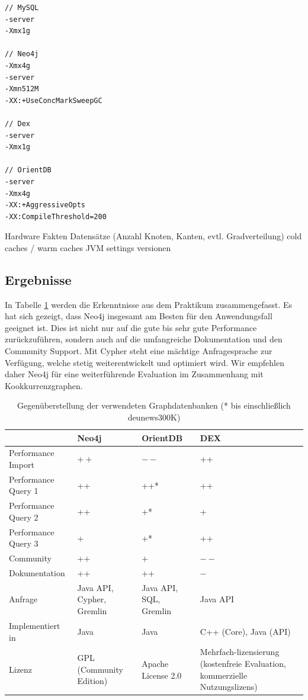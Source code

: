 \documentclass[11pt, a4paper, oneside]{article} %
\begin{document}
\begin{lstlisting}
// MySQL
-server
-Xmx1g

// Neo4j
-Xmx4g
-server
-Xmn512M
-XX:+UseConcMarkSweepGC

// Dex
-server
-Xmx1g

// OrientDB
-server
-Xmx4g
-XX:+AggressiveOpts 
-XX:CompileThreshold=200
\end{lstlisting}


Hardware Fakten
Datensätze (Anzahl Knoten, Kanten, evtl. Gradverteilung)
cold caches / warm caches
JVM settings
versionen

\subsection{Ergebnisse}

In Tabelle \ref{tab:compare} werden die Erkenntnisse aus dem Praktikum zusammengefasst. Es hat sich gezeigt, dass Neo4j insgesamt am Besten für den Anwendungsfall geeignet ist. Dies ist nicht nur auf die gute bis sehr gute Performance zurückzuführen, sondern auch auf die umfangreiche Dokumentation und den Community Support. Mit Cypher steht eine mächtige Anfragesprache zur Verfügung, welche stetig weiterentwickelt und optimiert wird. Wir empfehlen daher Neo4j für eine weiterführende Evaluation im Zusammenhang mit Kookkurrenzgraphen.

\renewcommand{\arraystretch}{1.5}

\begin{table}[ht]
\begin{tabular}{|l||p{2.5cm}|p{2.5cm}|p{2.5cm}|}
\hline 
 & \textbf{Neo4j} & \textbf{OrientDB} & \textbf{DEX} \\ 
\hline
Performance Import & $++$ & $--$ & ++ \\ 
\hline 
Performance Query 1 & ++ & ++* & ++ \\ 
\hline 
Performance Query 2 & ++ & +* & + \\ 
\hline 
Performance Query 3 & + & +* & ++ \\ 
\hline
Community & ++ & + & $--$ \\ 
\hline 
Dokumentation & ++ & ++ & $-$ \\
\hline 
Anfrage & Java API, Cypher, Gremlin & Java API, SQL, Gremlin & Java API \\
\hline
Implementiert in & Java & Java & C++ (Core), Java (API) \\
\hline 
Lizenz & GPL (Community Edition) & Apache License 2.0 & Mehrfach-lizensierung (kostenfreie Evaluation, kommerzielle Nutzungslizens)	 \\ 
\hline 
\end{tabular}
\caption{Gegenüberstellung der verwendeten Graphdatenbanken (* bis einschließlich deu\textunderscore news\textunderscore 300K)}
\label{tab:compare}
\end{table}
\end{document}
